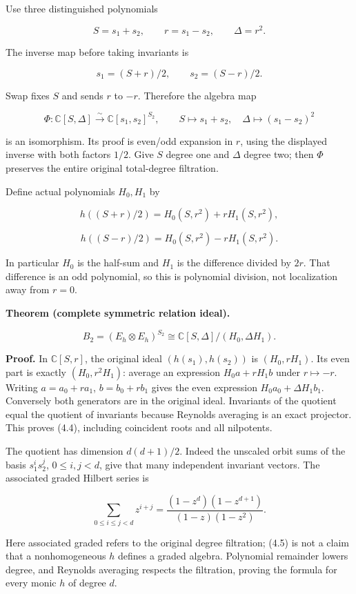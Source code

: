 Use three distinguished polynomials

\[S=s_1+s_2,\qquad r=s_1-s_2,\qquad \Delta=r^2.\tag{4.1}\]

The inverse map before taking invariants is

\[s_1=(S+r)/2,\qquad s_2=(S-r)/2.\]

Swap fixes \(S\) and sends \(r\) to \(-r\). Therefore the algebra map

\[\Phi:\mathbb C[S,\Delta]\xrightarrow{\sim}\mathbb C[s_1,s_2]^{S_2},\qquad
S\mapsto s_1+s_2,\quad\Delta\mapsto(s_1-s_2)^2\tag{4.2}\]

is an isomorphism. Its proof is even/odd expansion in \(r\), using the
displayed inverse with both factors \(1/2\). Give \(S\) degree one and
\(\Delta\) degree two; then \(\Phi\) preserves the entire original
total-degree filtration.

Define actual polynomials \(H_0,H_1\) by

\[h((S+r)/2)=H_0(S,r^2)+rH_1(S,r^2),\]

\[h((S-r)/2)=H_0(S,r^2)-rH_1(S,r^2).\tag{4.3}\]

In particular \(H_0\) is the half-sum and \(H_1\) is the difference
divided by \(2r\). That difference is an odd polynomial, so this is
polynomial division, not localization away from \(r=0\).

\textbf{Theorem (complete symmetric relation ideal).}

\[\boxed{B_2=(E_h\otimes E_h)^{S_2}
\cong\mathbb C[S,\Delta]/(H_0,\Delta H_1).}\tag{4.4}\]

\textbf{Proof.} In \(\mathbb C[S,r]\), the original ideal
\((h(s_1),h(s_2))\) is \((H_0,rH_1)\). Its even part is exactly
\((H_0,r^2H_1)\): average an expression \(H_0a+rH_1b\) under
\(r\mapsto-r\). Writing \(a=a_0+r a_1\), \(b=b_0+r b_1\) gives the even
expression \(H_0a_0+\Delta H_1b_1\). Conversely both generators are in
the original ideal. Invariants of the quotient equal the quotient of
invariants because Reynolds averaging is an exact projector. This proves
(4.4), including coincident roots and all nilpotents.

The quotient has dimension \(d(d+1)/2\). Indeed the unscaled orbit sums
of the basis \(s_1^is_2^j\), \(0\le i,j<d\), give that many independent
invariant vectors. The associated graded Hilbert series is

\[\sum_{0\le i\le j<d}z^{i+j}
=\frac{(1-z^d)(1-z^{d+1})}{(1-z)(1-z^2)}.\tag{4.5}\]

Here associated graded refers to the original degree filtration; (4.5)
is not a claim that a nonhomogeneous \(h\) defines a graded algebra.
Polynomial remainder lowers degree, and Reynolds averaging respects the
filtration, proving the formula for every monic \(h\) of degree \(d\).

